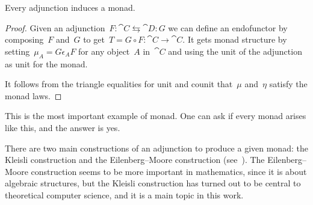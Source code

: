 \documentclass[../TFG.tex]{subfiles}
\begin{document}
\begin{proposition}
    \label{prop:adjunction-induces-monad}
    Every adjunction induces a monad.
\end{proposition}
\begin{proof}
    Given an adjunction~\(F:\cat{C}\leftrightarrows\cat{D}:G\) we can define an
    endofunctor by composing~\(F\) and~\(G\) to get~\(T = G \circ
    F:\cat{C}\longrightarrow\cat{C}\). It gets monad structure by
    setting~\(\mu_{A} = G \epsilon_{A}F\) for any object~\(A\) in~\(\cat{C}\)
    and using the unit of the adjunction as unit for the monad.

    It follows from the triangle equalities for unit and counit that~\(\mu\)
    and~\(\eta\) satisfy the monad laws.
\end{proof}
This is the most important example of monad. One can ask if every monad arises
like this, and the answer is yes.

There are two main constructions of an adjunction to produce a given monad: the
Kleisli construction and the Eilenberg--Moore construction (see~\cite{maclane}).
The Eilenberg--Moore construction seems to be more important in mathematics,
since it is about algebraic structures, but the Kleisli construction has turned
out to be central to theoretical computer science, and it is a main topic in
this work.
\end{document}
